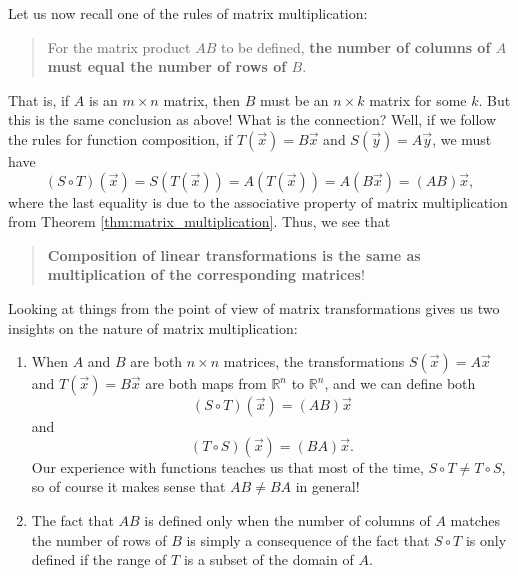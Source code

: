 Let us now recall one of the rules of matrix multiplication:

\begin{quote}
For the matrix product $AB$ to be defined, \textbf{the number of columns of $A$ must equal the number of rows of $B$}.
\end{quote}

That is, if $A$ is an $m\times n$ matrix, then $B$ must be an $n\times k$ matrix for some $k$. But this is the same conclusion as above! What is the connection? Well, if we follow the rules for function composition, if $T(\vec x) = B\vec x$ and $S(\vec y) = A\vec y$, we must have
\[
(S\circ T)(\vec x) = S(T(\vec x)) = A(T(\vec x)) = A(B\vec x) = (AB)\vec x,
\]
where the last equality is due to the associative property of matrix multiplication from Theorem \ref{thm:matrix_multiplication}. Thus, we see that
\begin{quote}
\textbf{Composition of linear transformations is the same as multiplication of the corresponding matrices}!
\end{quote}

Looking at things from the point of view of matrix transformations gives us two insights on the nature of matrix multiplication:
\begin{enumerate}
\item When $A$ and $B$ are both $n\times n$ matrices, the transformations $S(\vec x) = A\vec x$ and $T(\vec x) = B\vec x$ are both maps from $\mathbb{R}^n$ to $\mathbb{R}^n$, and we can define both
\[
(S\circ T)(\vec x) = (AB)\vec x
\]
and
\[
(T\circ S)(\vec x) = (BA)\vec x.
\]
Our experience with functions teaches us that most of the time, $S\circ T \neq T\circ S$, so of course it makes sense that $AB\neq BA$ in general!

\item The fact that $AB$ is defined only when the number of columns of $A$ matches the number of rows of $B$ is simply a consequence of the fact that $S\circ T$ is only defined if the range of $T$ is a subset of the domain of $A$.
\end{enumerate}

